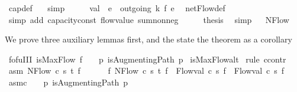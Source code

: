 \begin{isabellebody}
\ cap{\isacharunderscore}def\ \ \isamarkupfalse%
\ simp\isanewline
\ \ \isamarkupfalse%
\ \isamarkupfalse%
\ {\isachardoublequoteopen}val\ {\isasymle}\ {\isacharparenleft}{\isasymSum}e\ {\isasymin}\ outgoing{\isacharprime}\ k{\isachardot}\ f\ e{\isacharparenright}{\isachardoublequoteclose}\ \isamarkupfalse%
\ netFlow{\isacharunderscore}def\isanewline
\ \ \ \ \isamarkupfalse%
\ {\isacharparenleft}simp\ add{\isacharcolon}\ capacity{\isacharunderscore}const\ flow{\isacharunderscore}value\ sum{\isacharunderscore}nonneg{\isacharparenright}\isanewline
\ \ \isamarkupfalse%
\ \isamarkupfalse%
\ {\isacharquery}thesis\ \isamarkupfalse%
\ simp\isanewline
{}\isamarkupfalse%
%
\endisatagproof
{\isafoldproof}%
%
\isadelimproof
\isanewline
%
\endisadelimproof
\isanewline
{}\isamarkupfalse%
\ %
%
\isamarkuptrue%
\isamarkupfalse%
\ NFlow\ %
\begin{isamarkuptext}%
We prove three auxiliary lemmas first, and the state the theorem as a corollary%
\end{isamarkuptext}\isamarkuptrue%
\isamarkupfalse%
\ fofu{\isacharunderscore}I{\isacharunderscore}II{\isacharcolon}\ {\isachardoublequoteopen}isMaxFlow\ f\ {\isasymLongrightarrow}\ {\isasymnot}\ {\isacharparenleft}{\isasymexists}\ p{\isachardot}\ isAugmentingPath\ p{\isacharparenright}{\isachardoublequoteclose}\isanewline
%
\isadelimproof
%
\endisadelimproof
%
\isatagproof
{}\isamarkupfalse%
\ isMaxFlow{\isacharunderscore}alt\isanewline
{}\isamarkupfalse%
\ {\isacharparenleft}rule\ ccontr{\isacharparenright}\isanewline
\ \ \isamarkupfalse%
\ asm{\isacharcolon}\ {\isachardoublequoteopen}NFlow\ c\ s\ t\ f\ \isanewline
\ \ \ \ {\isasymand}\ {\isacharparenleft}{\isasymforall}f{\isacharprime}{\isachardot}\ NFlow\ c\ s\ t\ f{\isacharprime}\ {\isasymlongrightarrow}\ Flow{\isachardot}val\ c\ s\ f{\isacharprime}\ {\isasymle}\ Flow{\isachardot}val\ c\ s\ f{\isacharparenright}{\isachardoublequoteclose}\isanewline
\ \ \isamarkupfalse%
\ asm{\isacharunderscore}c{\isacharcolon}\ {\isachardoublequoteopen}{\isasymnot}\ {\isasymnot}\ {\isacharparenleft}{\isasymexists}\ p{\isachardot}\ isAugmentingPath\ p{\isacharparenright}{\isachardoublequoteclose}\isanewline
\ \ \isamarkupfalse%
\ \isamarkupfalse%

\end{isabellebody}
